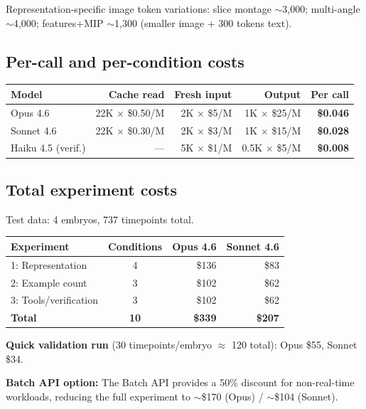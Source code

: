 \documentclass[11pt, a4paper]{article}
\begin{document}
Representation-specific image token variations: slice montage $\sim$3{,}000;
multi-angle $\sim$4{,}000; features+MIP $\sim$1{,}300 (smaller image + 300 tokens
text).

\subsection{Per-call and per-condition costs}

\begin{center}
\small
\begin{tabular}{@{}lrrrr@{}}
\toprule
\textbf{Model} & \textbf{Cache read} & \textbf{Fresh input}
  & \textbf{Output} & \textbf{Per call} \\
\midrule
Opus 4.6
  & 22K $\times$ \$0.50/M & 2K $\times$ \$5/M
  & 1K $\times$ \$25/M & \textbf{\$0.046} \\
Sonnet 4.6
  & 22K $\times$ \$0.30/M & 2K $\times$ \$3/M
  & 1K $\times$ \$15/M & \textbf{\$0.028} \\
Haiku 4.5 (verif.)
  & --- & 5K $\times$ \$1/M
  & 0.5K $\times$ \$5/M & \textbf{\$0.008} \\
\bottomrule
\end{tabular}
\end{center}

\subsection{Total experiment costs}

Test data: 4 embryos, 737 timepoints total.

\begin{center}
\small
\begin{tabular}{@{}lcrr@{}}
\toprule
\textbf{Experiment} & \textbf{Conditions}
  & \textbf{Opus 4.6} & \textbf{Sonnet 4.6} \\
\midrule
1: Representation    & 4 & \$136 & \$83 \\
2: Example count     & 3 & \$102 & \$62 \\
3: Tools/verification & 3 & \$102 & \$62 \\
\midrule
\textbf{Total}       & \textbf{10} & \textbf{\$339} & \textbf{\$207} \\
\bottomrule
\end{tabular}
\end{center}

\textbf{Quick validation run} (30 timepoints/embryo $\approx$ 120 total):
Opus \$55, Sonnet \$34.

\textbf{Batch API option:} The Batch API provides a 50\% discount for
non-real-time workloads, reducing the full experiment to $\sim$\$170 (Opus) /
$\sim$\$104 (Sonnet).
\end{document}
